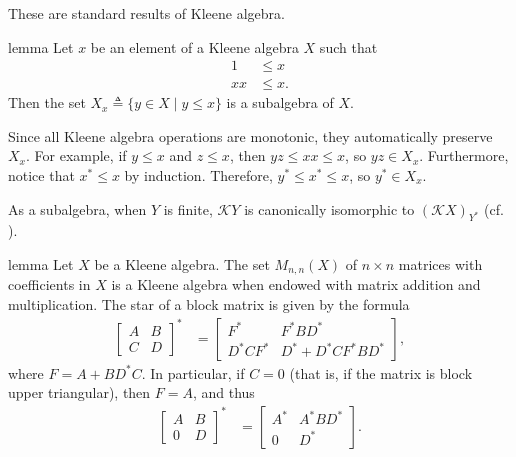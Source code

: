 \documentclass[a4paper,UKenglish,cleveref, autoref, thm-restate]{lipics-v2021}
\begin{document}
\begin{proofEnd}
  These are standard results of Kleene algebra.
\end{proofEnd}

\begin{theoremEnd}{lemma}
  \label{lem:ideal-subalgebra}
  Let $x$ be an element of a Kleene algebra $X$ such that
  \begin{align*}
    1 &  \leq  x \\
    xx &  \leq  x.
  \end{align*}
  Then the set $X_x  \triangleq  \{ y  \in  X  \mid  y  \leq  x \}$ is a subalgebra of $X$.
\end{theoremEnd}

\begin{proofEnd}
  Since all Kleene algebra operations are monotonic, they automatically preserve
  $X_x$.  For example, if $y  \leq  x$ and $z  \leq  x$, then $yz  \leq  xx  \leq  x$, so
  $yz  \in  X_x$.  Furthermore, notice that $x^*  \leq  x$ by induction.  Therefore,
  $y^*  \leq  x^*  \leq  x$, so $y^*  \in  X_x$.
\end{proofEnd}

As a subalgebra, when $Y$ is finite, $\mathcal{K}Y$ is canonically isomorphic to
$(\mathcal{K}X)_{Y^*}$ (cf. ).

\begin{theoremEnd}{lemma}
  \label{lem:matrix-ka}
  Let $X$ be a Kleene algebra.  The set $M_{n,n}(X)$ of $n  \times  n$ matrices with
  coefficients in $X$ is a Kleene algebra when endowed with matrix addition and
  multiplication.  The star of a block matrix is given by the formula
  \begin{align*}
    \begin{bmatrix}
      A & B \\
      C & D
    \end{bmatrix}^*
    & =
      \begin{bmatrix}
        F^* & F^*BD^* \\
        D^*CF^* & D^* + D^*CF^*BD^*
      \end{bmatrix},
  \end{align*}
  where $F = A + BD^*C$.  In particular, if $C = 0$ (that is, if the matrix is
  block upper triangular), then $F = A$, and thus
  \begin{align*}
    \begin{bmatrix}
      A & B \\
      0 & D
    \end{bmatrix}^*
    & =
      \begin{bmatrix}
        A^* & A^*BD^* \\
        0 & D^*
      \end{bmatrix}.
  \end{align*}
\end{theoremEnd}
\end{document}
